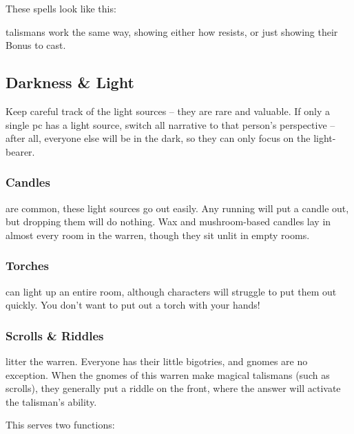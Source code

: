 \begin{multicols}{2}
{  These spells look like this:

  \begin{exampletext}
    \showStdSpells
  \end{exampletext}

  \Glspl{talisman} work the same way, showing either how  resists, or just showing their Bonus to cast.
}{}

\subsection{Darkness \& Light}

Keep careful track of the light sources -- they are rare and valuable.
If only a single \gls{pc} has a light source, switch all narrative to that person's perspective -- after all, everyone else will be in the dark, so they can only focus on the light-bearer.%

\subsubsection{Candles}
are common, these light sources go out easily.
Any running will put a candle out, but dropping them will do nothing.
Wax and mushroom-based candles lay in almost every room in the \gls{warren}, though they sit unlit in empty rooms.

\subsubsection{Torches}
can light up an entire room, although characters will struggle to put them out quickly.
You don't want to put out a torch with your hands!

\subsubsection{Scrolls \& Riddles}
\label{scrollRiddles}
litter the \gls{warren}.
Everyone has their little bigotries, and gnomes are no exception.
When the gnomes of this \gls{warren} make magical \glspl{talisman} (such as scrolls), they generally put a riddle on the front, where the answer will activate the \gls{talisman}'s ability.

This serves two functions:


\end{multicols}
